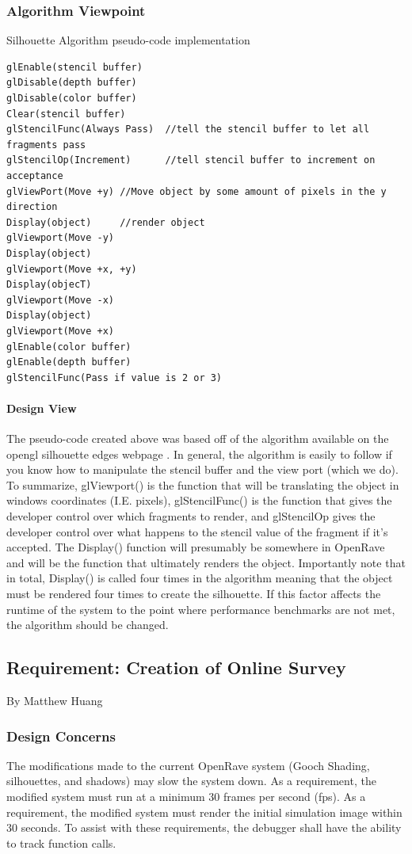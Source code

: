 \begin{flushleft}
\subsubsection{Algorithm Viewpoint}
Silhouette Algorithm pseudo-code implementation

\begin{lstlisting}
glEnable(stencil buffer)
glDisable(depth buffer)
glDisable(color buffer)
Clear(stencil buffer)
glStencilFunc(Always Pass)	//tell the stencil buffer to let all fragments pass
glStencilOp(Increment)		//tell stencil buffer to increment on acceptance
glViewPort(Move +y)	//Move object by some amount of pixels in the y direction
Display(object)		//render object
glViewport(Move -y)
Display(object)
glViewport(Move +x, +y)
Display(objecT)
glViewport(Move -x)
Display(object)
glViewport(Move +x)
glEnable(color buffer)
glEnable(depth buffer)
glStencilFunc(Pass if value is 2 or 3)
\end{lstlisting}

\paragraph{Design View}
The pseudo-code created above was based off of the algorithm available on the opengl silhouette edges webpage \cite{siledges}.
In general, the algorithm is easily to follow if you know how to manipulate the stencil buffer and the view port (which we do).
To summarize, glViewport() is the function that will be translating the object in windows coordinates (I.E. pixels), glStencilFunc() is the function that gives the developer control over which fragments to render, and glStencilOp gives the developer control over what happens to the stencil value of the fragment if it's accepted.
The Display() function will presumably be somewhere in OpenRave and will be the function that ultimately renders the object.
Importantly note that in total, Display() is called four times in the algorithm meaning that the object must be rendered four times to create the silhouette.
If this factor affects the runtime of the system to the point where performance benchmarks are not met, the algorithm should be changed.

\newpage

\subsection{Requirement: Creation of Online Survey}
\large{By Matthew Huang}

\normalsize
\subsubsection{Design Concerns}
The modifications made to the current OpenRave system (Gooch Shading, silhouettes, and shadows) may slow the system down.
As a requirement, the modified system must run at a minimum 30 frames per second (fps).
As a requirement, the modified system must render the initial simulation image within 30 seconds.
To assist with these requirements, the debugger shall have the ability to track function calls.


\end{flushleft}
